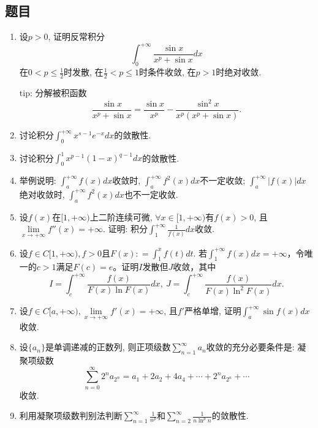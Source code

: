 \documentclass[UTF8,11pt, a4paper, oneside, fontset=none]{ctexbook}
\begin{document}
\subsection*{题目}
\begin{enumerate}

\item 设$p>0$, 证明反常积分
\[
\int_0^{+\infty} \frac{\sin x}{x^p + \sin x}dx
\]
在$0 < p \leq \frac{1}{2}$时发散, 在$\frac{1}{2} < p \leq 1$时条件收敛, 在$p >1$时绝对收敛.

tip: 分解被积函数
\[
\frac{\sin x}{x^p + \sin x} = \frac{\sin x}{x^p} - \frac{\sin^2 x}{x^p(x^p + \sin x)}.
\]

\item 讨论积分$\int_0^{+\infty} x^{s-1} e^{-x}dx$的敛散性.

\item 讨论积分$\int_0^1 x^{p-1} (1-x)^{q-1} dx$的敛散性.

\item 举例说明: $\int_a^{+\infty} f(x) dx$收敛时, $\int_a^{+\infty} f^2(x) dx$不一定收敛; $\int_a^{+\infty} |f(x)| dx$绝对收敛时, $\int_a^{+\infty} f^2(x) dx$也不一定收敛.

\item 设$f(x)$在$[1, +\infty)$上二阶连续可微, $\forall x \in [1, +\infty)$有$f(x) > 0$, 且$\lim\limits_{x \to +\infty} f''(x)= +\infty$. 证明: 积分$\int_1^{+\infty} \frac{1}{f(x)} dx$收敛.

\item 设$f \in C[1, +\infty), f>0$且$F(x) : = \int_1^x f(t) dt$. 若$\int_1^{+\infty} f(x) dx = +\infty$，令唯一的$c>1$满足$F(c)=e$。证明$I$发散但$J$收敛，其中
\[
I = \int_c^{+\infty} \frac{f(x)}{F(x) \ln F(x)} dx, \ J = \int_c^{+\infty} \frac{f(x)}{F(x) \ln^2 F(x)} dx.
\]

\item 设$f \in C[a, +\infty), \lim\limits_{x \to +\infty} f'(x) = +\infty$, 且$f'$严格单增, 证明$\int_a^{+\infty} \sin f(x) dx$收敛.

\item 设$\{ a_n \}$是单调递减的正数列, 则正项级数$\sum_{n=1}^{\infty} a_n$收敛的充分必要条件是: 凝聚项级数
\[
\sum_{n = 0}^{\infty} 2^n a_{2^n} = a_1 + 2 a_2 + 4 a_4 + \cdots + 2^n a_{2^n} + \cdots
\]
收敛.

\item 利用凝聚项级数判别法判断$\sum_{n=1}^{\infty} \frac{1}{n^p}$和$\sum_{n=2}^{\infty} \frac{1}{n \ln^p n}$的敛散性.

\end{enumerate}
\clearpage
\end{document}
